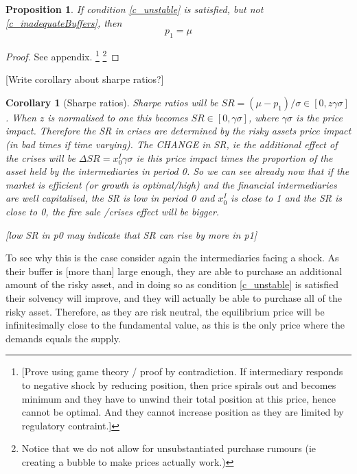 \documentclass[11pt]{article}
\newtheorem{proposition}{Proposition}
\newtheorem{corollary}{Corollary}
\begin{document}
\begin{proposition} \label{p_pricewBuffer}
If condition \ref{c_unstable} is satisfied, but not \ref{c_inadequateBuffers}, then 
\begin{equation}
p_1 = \mu
\end{equation}
\end{proposition}
\begin{proof}
See appendix.
\footnote{[Prove using game theory / proof by contradiction. If intermediary responds to negative shock by reducing position, then price spirals out and becomes minimum and they have to unwind their total position at this price, hence cannot be optimal. And they cannot increase position as they are limited by regulatory contraint.]}
\footnote{Notice that we do not allow for unsubstantiated purchase rumours (ie creating a bubble to make prices actually work.)}
\end{proof}

[Write corollary about sharpe ratios?] 
\begin{corollary}[Sharpe ratios]
Sharpe ratios will be $SR = ( \mu - p_1 ) / \sigma \in [0,z\gamma\sigma]$. When $z$ is normalised to one this becomes $SR \in [0,\gamma\sigma]$, where $\gamma\sigma$ is the price impact. Therefore the SR in crises are determined by the risky assets price impact (in bad times if time varying). The CHANGE in SR, ie the additional effect of the crises will be $\Delta SR = x^I_0\gamma\sigma$ ie this price impact times the proportion of the asset held by the intermediaries in period 0. So we can see already now that if the market is efficient (or growth is optimal/high) and the financial intermediaries are well capitalised, the SR is low in period 0 and $x^I_0$ is close to 1 and the SR is close to 0, the fire sale /crises effect will be bigger.

[low SR in p0 may indicate that SR can rise by more in p1]

\end{corollary}

To see why this is the case consider again the intermediaries facing a shock. As their buffer is [more than] large enough, they are able to purchase an additional amount of the risky asset, and in doing so as condition \ref{c_unstable} is satisfied their solvency will improve, and they will actually be able to purchase all of the risky asset. Therefore, as they are risk neutral, the equilibrium price will be infinitesimally close to the fundamental value, as this is the only price where the demands equals the supply.
\end{document}
